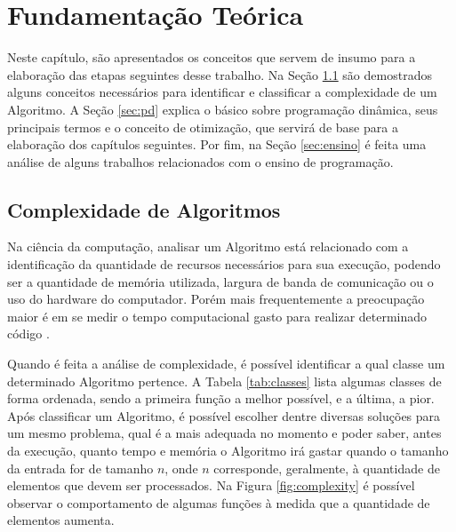 
\chapter{Fundamentação Teórica}
\label{chap:fundamentacao}

Neste capítulo, são apresentados os conceitos que servem de insumo para a elaboração das etapas seguintes desse trabalho. Na Seção \ref{sec:complexidade} são demostrados alguns conceitos necessários para identificar e classificar a complexidade de um Algoritmo. A Seção \ref{sec:pd} explica o básico sobre programação dinâmica, seus principais termos e o conceito de otimização, que servirá de base para a elaboração dos capítulos seguintes. Por fim, na Seção \ref{sec:ensino} é feita uma análise de alguns trabalhos relacionados com o ensino de programação.



\section{Complexidade de Algoritmos}
\label{sec:complexidade}
Na ciência da computação, analisar um Algoritmo está relacionado com a identificação da quantidade de recursos necessários para sua execução, podendo ser a quantidade de memória utilizada, largura de banda de comunicação ou o uso do hardware do computador. Porém mais frequentemente a preocupação maior é em se medir o tempo computacional gasto para realizar determinado código \cite{Cormen09a}.

Quando é feita a análise de complexidade, é possível identificar a qual classe um determinado Algoritmo pertence. A Tabela \ref{tab:classes} lista algumas classes de forma ordenada, sendo a primeira função a melhor possível, e a última, a pior. Após classificar um Algoritmo, é possível escolher dentre diversas soluções para um mesmo problema, qual é a mais adequada no momento e poder saber, antes da execução, quanto tempo e memória o Algoritmo irá gastar quando o tamanho da entrada for de tamanho $n$, onde $n$ corresponde, geralmente, à quantidade de elementos que devem ser processados. Na Figura \ref{fig:complexity} é possível observar o comportamento de algumas funções à medida que a quantidade de elementos aumenta.


